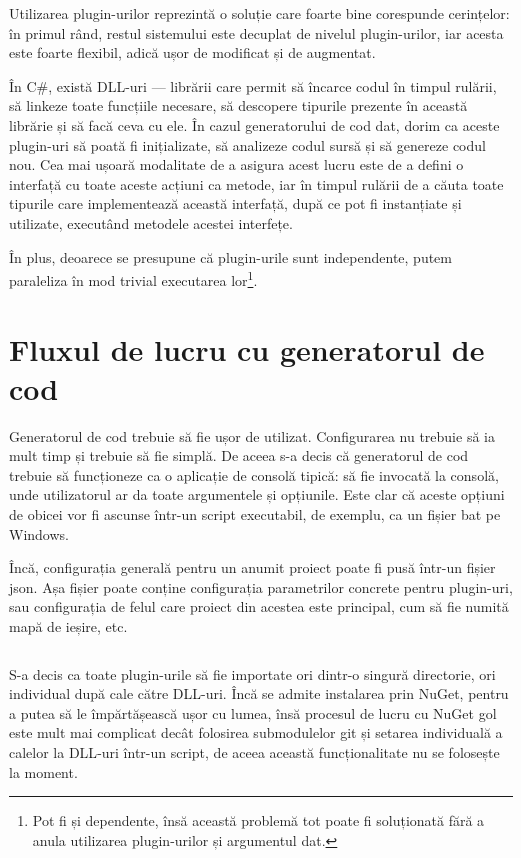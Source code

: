 \documentclass[a4paper,12pt]{report}
\begin{document}
Utilizarea plugin-urilor reprezintă o soluție care foarte bine corespunde cerințelor: în primul rând, restul sistemului este decuplat de nivelul plugin-urilor, iar acesta este foarte flexibil, adică ușor de modificat și de augmentat.

În C\#, există \ac{DLL}-uri --- librării care permit să încarce codul în timpul rulării, să linkeze toate funcțiile necesare, să descopere tipurile prezente în această librărie și să facă ceva cu ele.
În cazul generatorului de cod dat, dorim ca aceste plugin-uri să poată fi inițializate, să analizeze codul sursă și să genereze codul nou.
Cea mai ușoară modalitate de a asigura acest lucru este de a defini o interfață cu toate aceste acțiuni ca metode, iar în timpul rulării de a căuta toate tipurile care implementează această interfață, după ce pot fi instanțiate și utilizate, executând metodele acestei interfețe.

În plus, deoarece se presupune că plugin-urile sunt independente, putem paraleliza în mod trivial executarea lor\footnote{Pot fi și dependente, însă această problemă tot poate fi soluționată fără a anula utilizarea plugin-urilor și argumentul dat.}.

\section{Fluxul de lucru cu generatorul de cod}

Generatorul de cod trebuie să fie ușor de utilizat.
Configurarea nu trebuie să ia mult timp și trebuie să fie simplă.
De aceea s-a decis că generatorul de cod trebuie să funcționeze ca o aplicație de consolă tipică: să fie invocată la consolă, unde utilizatorul ar da toate argumentele și opțiunile.
Este clar că aceste opțiuni de obicei vor fi ascunse într-un script executabil, de exemplu, ca un fișier bat pe Windows.

Încă, configurația generală pentru un anumit proiect poate fi pusă într-un fișier json.
Așa fișier poate conține configurația parametrilor concrete pentru plugin-uri, sau configurația de felul care proiect din acestea este principal, cum să fie numită mapă de ieșire, etc.
\inputminted{js}{../race/game/kari.json}


S-a decis ca toate plugin-urile să fie importate ori dintr-o singură directorie, ori individual după cale către \ac{DLL}-uri.
Încă se admite instalarea prin NuGet, pentru a putea să le împărtășească ușor cu lumea, însă procesul de lucru cu NuGet gol este mult mai complicat decât folosirea submodulelor git și setarea individuală a calelor la \ac{DLL}-uri într-un script, de aceea această funcționalitate nu se folosește la moment.
\end{document}
